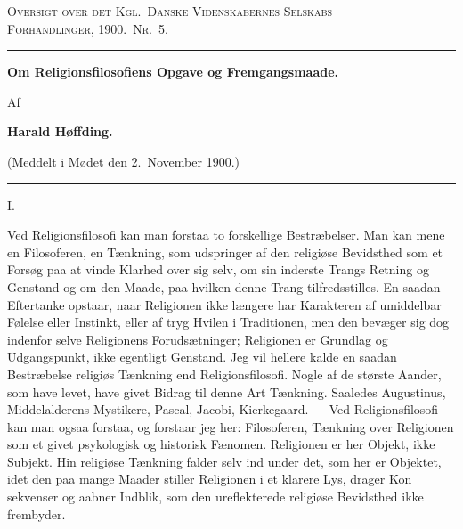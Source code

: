 \documentclass[12pt,a4paper]{article}
\newcommand{\snum}[1]{\bigskip\begin{center}#1\end{center}\nopagebreak\medskip}
\newcommand{\opage}[1]{\marginnote{\footnotesize\textit{[#1]}}}
\begin{document}
%
\begin{center}
  {\footnotesize\scshape Oversigt over det Kgl.\ Danske Videnskabernes Selskabs\\
   Forhandlinger, 1900.\ Nr.\ 5.}

  \rule{4em}{0.4pt}

  \bigskip
  {\large\bfseries Om Religionsfilosofiens Opgave og Fremgangsmaade.}

  \medskip
  Af

  \smallskip
  {\bfseries Harald Høffding.}

  \smallskip
  {\small (Meddelt i Mødet den 2.\ November 1900.)}

  \medskip
  \rule{4em}{0.4pt}
\end{center}

\medskip

\opage{411} %
\snum{I.}

Ved Religionsfilosofi kan man forstaa to forskellige Bestræbelser. Man kan
mene en Filosoferen, en Tænkning, som udspringer af den religiøse Bevidsthed
som et Forsøg paa at vinde Klarhed over sig selv, om sin inderste Trangs
Retning og Genstand og om den Maade, paa hvilken denne Trang tilfredsstilles.
En saadan Eftertanke opstaar, naar Religionen ikke længere har Karakteren af
umiddelbar Følelse eller Instinkt, eller af tryg Hvilen i Traditionen, men den
bevæger sig dog indenfor selve Religionens Forudsætninger; Religionen er
Grundlag og Udgangspunkt, ikke egentligt Genstand. Jeg vil hellere kalde en
saadan Bestræbelse religiøs Tænkning end Religionsfilosofi. Nogle af de
største Aander, som have levet, have givet Bidrag til denne Art Tænkning.
Saaledes Augustinus, Middelalderens Mystikere, Pascal, Jacobi, Kierkegaard.
--- Ved Religionsfilosofi kan man ogsaa forstaa, og forstaar jeg her:
Filosoferen, Tænkning over Religionen som et givet psykologisk og historisk
Fænomen. Religionen er her Objekt, ikke Subjekt. Hin religiøse Tænkning falder
selv ind under det, som her er Objektet, idet den paa mange Maader stiller
Religionen i et klarere Lys, drager Kon%
\opage{412}sekvenser
og aabner Indblik, som den ureflekterede religiøse Bevidsthed ikke frembyder.
\end{document}
